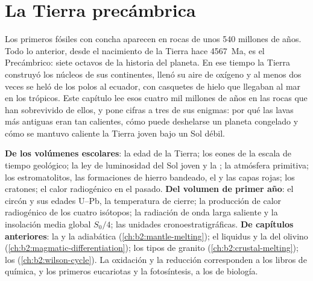 \chapter{La Tierra precámbrica}\label{ch:b2:precambrian-earth}

Los primeros fósiles con concha aparecen en rocas de unos 540 millones de años. Todo lo anterior, desde
el nacimiento de la Tierra hace \qty{4567}{Ma}, es el Precámbrico: siete octavos de la historia del
planeta. En ese tiempo la Tierra construyó los núcleos de sus continentes, llenó su aire de oxígeno
y al menos dos veces se heló de los polos al ecuador, con casquetes de hielo que llegaban al mar
en los trópicos. Este capítulo lee esos cuatro mil millones de años en las rocas que han sobrevivido de ellos,
y pone cifras a tres de sus enigmas: por qué las lavas más antiguas eran tan calientes, cómo puede deshelarse un
planeta congelado y cómo se mantuvo caliente la Tierra joven bajo un Sol débil.

\begin{recall}
\textbf{De los volúmenes escolares}: la edad de la Tierra; los eones de la escala de tiempo geológico;
la ley de luminosidad del Sol joven y la ; la atmósfera primitiva;
los estromatolitos, las formaciones de hierro bandeado, el  y las capas rojas; los cratones;
el calor radiogénico en el pasado. \textbf{Del volumen de primer año}: el circón y sus edades U--Pb, la
temperatura de cierre; la producción de calor radiogénico de los cuatro isótopos; la radiación de onda larga
saliente y la insolación media global $S_0/4$; las unidades cronoestratigráficas.
\textbf{De capítulos anteriores}: la  y la adiabática
(\cref{ch:b2:mantle-melting}); el liquidus y la  del olivino
(\cref{ch:b2:magmatic-differentiation}); los tipos de granito (\cref{ch:b2:crustal-melting});
los  (\cref{ch:b2:wilson-cycle}). La oxidación y la reducción corresponden a los libros de
química, y los primeros eucariotas y la fotosíntesis, a los de biología.
\end{recall}

